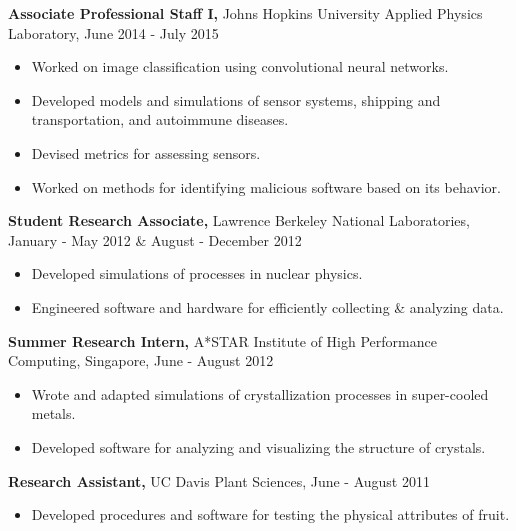 \documentclass[margin]{res}
\begin{document}
\begin{resume}
{\bf Associate Professional Staff I,} Johns Hopkins University Applied Physics Laboratory, June 2014 - July 2015 
\begin{itemize} \itemsep -2pt
 \item Worked on image classification using convolutional neural networks. \item Developed models and simulations of sensor systems, shipping and transportation, and autoimmune diseases. \item Devised metrics for assessing sensors. \item Worked on methods for identifying malicious software based on its behavior. \end{itemize}\vspace{-8pt}
 {\bf Student Research Associate,} Lawrence Berkeley National Laboratories, January - May 2012 \& August - December 2012
\begin{itemize} \itemsep -2pt
  \item Developed simulations of processes in nuclear physics. \item Engineered software and hardware for efficiently collecting \& analyzing data. \end{itemize}\vspace{-8pt}
{\bf Summer Research Intern,} A*STAR Institute of High Performance Computing, Singapore, June - August 2012
\begin{itemize} \itemsep -2pt
  \item Wrote and adapted simulations of crystallization processes in super-cooled metals. \item Developed software for analyzing and visualizing the structure of crystals. \end{itemize}\vspace{-8pt}
{\bf Research Assistant,} UC Davis Plant Sciences, June - August 2011
 \begin{itemize} \itemsep -2pt
  \item Developed procedures and software for testing the physical attributes of fruit. \end{itemize}


\end{resume}
\end{document}

